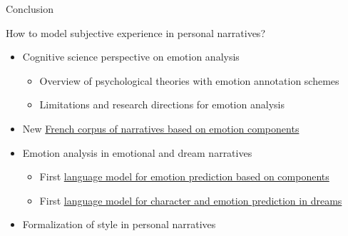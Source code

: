 \documentclass[handout,10pt]{beamer}
\begin{document}
\begin{frame}{Conclusion}

How to model subjective experience in personal narratives?

\vspace{0.5cm}
\pause


\begin{itemize}[<+->]
  \setlength{\itemsep}{1.0em}
  \item Cognitive science perspective on emotion analysis
  \begin{itemize}[<+->]\footnotesize
    \setlength{\itemsep}{0.5em}
    \item Overview of psychological theories with emotion annotation schemes
    \item Limitations and research directions for emotion analysis
  \end{itemize}
  \item New \href{https://huggingface.co/datasets/gustavecortal/FrenchEmotionalNarratives}{French corpus of narratives based on emotion components}
  \item Emotion analysis in emotional and dream narratives 
  \begin{itemize}[<+->]\footnotesize
    \setlength{\itemsep}{0.5em}
    \item First \href{https://huggingface.co/gustavecortal/distilcamembert-cae-all}{language model for emotion prediction based on components}
    \item First \href{https://huggingface.co/gustavecortal/dream-t5}{language model for character and emotion prediction in dreams}
  \end{itemize}
  \item Formalization of style in personal narratives
\end{itemize}

\vspace{0.5cm}





\end{frame}
\end{document}
